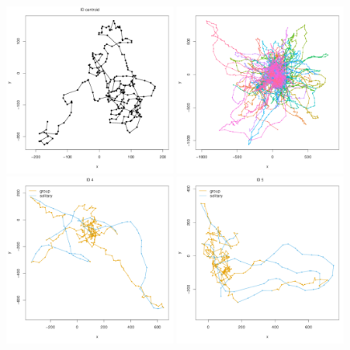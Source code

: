 \documentclass[12pt]{article}\usepackage[]{graphicx}\usepackage[]{xcolor}
\begin{document}
\begin{figure}[htbp]
  \includegraphics[width=0.49\textwidth]{plot_groupExampleCentroid001.pdf}
  \includegraphics[width=0.49\textwidth]{plot_groupExample001.pdf}\\
  \includegraphics[width=0.49\textwidth]{plot_groupExampleResults007.pdf}
  \includegraphics[width=0.49\textwidth]{plot_groupExampleResults008.pdf}\\

\end{figure}
\end{document}
